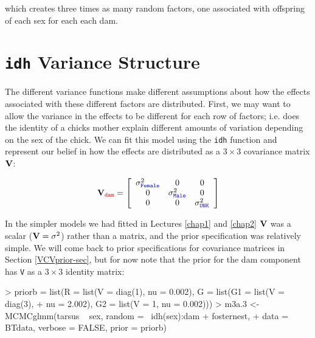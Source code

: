 \documentclass{article}
\begin{document}
which creates three times as many random factors, one associated with offspring of each sex for each each dam.  

\section{\texttt{idh} Variance Structure}

The different variance functions make different assumptions about how the effects associated with these different factors are distributed. First, we may want to allow the variance in the effects to be different for each row of factors; i.e. does the identity of a chicks mother explain different amounts of variation depending on the sex of the chick. We can fit this model using the \texttt{idh} function and represent our belief in how the effects are distributed as a $3\times3$ covariance matrix ${\bf V}$:    

\begin{displaymath}
{\bf V}_{{\color{red} \texttt{dam}}}=
\left[
\begin{array}{ccc}
\sigma^{2}_{\color{blue}\texttt{Female}}&0&0\\
0&\sigma^{2}_{\color{blue}\texttt{Male}}&0\\
0&0&\sigma^{2}_{\color{blue}\texttt{UNK}}\\
\end{array}
\right]
\end{displaymath}

In the simpler models we had fitted in Lectures \ref{chap1} and \ref{chap2} ${\bf V}$ was a scalar (${\bf V} = \sigma^{2}$) rather than a matrix, and the prior specification was relatively simple.  We will come back to prior specifications for covariance matrices in Section \ref{VCVprior-sec}, but for now note that the prior for the dam component has \texttt{V} as a $3\times3$ identity matrix:  

\begin{Schunk}
\begin{Sinput}
> priorb = list(R = list(V = diag(1), nu = 0.002), G = list(G1 = list(V = diag(3), 
+     nu = 2.002), G2 = list(V = 1, nu = 0.002)))
> m3a.3 <- MCMCglmm(tarsus ~ sex, random = ~idh(sex):dam + fosternest, 
+     data = BTdata, verbose = FALSE, prior = priorb)
\end{Sinput}
\end{Schunk}
\end{document}
